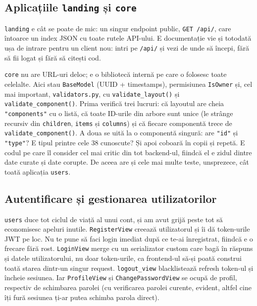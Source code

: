 \documentclass[12pt,a4paper]{report}
\begin{document}
\subsection{Aplicațiile \texttt{landing} și \texttt{core}}

\texttt{landing} e cât se poate de mic: un singur endpoint public, \texttt{GET /api/},
care întoarce un index JSON cu toate rutele API-ului. E documentație vie și totodată
ușa de intrare pentru un client nou: intri pe \texttt{/api/} și vezi de unde să
începi, fără să fii logat și fără să citești cod.

\texttt{core} nu are URL-uri deloc; e o bibliotecă internă pe care o folosesc toate
celelalte. Aici stau \texttt{BaseModel} (UUID + timestamps), permisiunea
\texttt{IsOwner} și, cel mai important, \texttt{validators.py}, cu
\texttt{validate\_layout()} și \texttt{validate\_component()}. Prima verifică trei
lucruri: că layoutul are cheia \texttt{"components"} cu o listă, că toate ID-urile din
arbore sunt unice (le strânge recursiv din \texttt{children}, \texttt{items} și
\texttt{columns}) și că fiecare componentă trece de \texttt{validate\_component()}. A
doua se uită la o componentă singură: are \texttt{"id"} și \texttt{"type"}? E tipul
printre cele 38 cunoscute? Și apoi coboară în copii și repetă. E codul pe care îl
consider cel mai critic din tot backend-ul, fiindcă el e zidul dintre date curate și
date corupte. De aceea are și cele mai multe teste, unsprezece, cât toată aplicația
\texttt{users}.

\subsection{Autentificare și gestionarea utilizatorilor}

\texttt{users} duce tot ciclul de viață al unui cont, și am avut grijă peste tot să
economisesc apeluri inutile. \texttt{RegisterView} creează utilizatorul și îi dă
token-urile JWT pe loc. Nu te pune să faci login imediat după ce te-ai înregistrat,
fiindcă e o frecare fără rost. \texttt{LoginView} merge cu un serializator custom care
bagă în răspuns și datele utilizatorului, nu doar token-urile, ca frontend-ul să-și
poată construi toată starea dintr-un singur request. \texttt{logout\_view}
blacklistează refresh token-ul și încheie sesiunea. Iar \texttt{ProfileView} și
\texttt{ChangePasswordView} se ocupă de profil, respectiv de schimbarea parolei (cu
verificarea parolei curente, evident, altfel cine îți fură sesiunea ți-ar putea
schimba parola direct).
\end{document}
